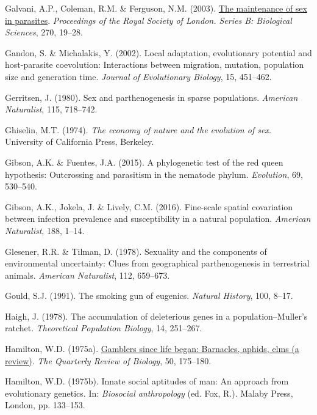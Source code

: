 \documentclass[
  letterpaper,
]{book}
\newlength{\cslhangindent}
\newenvironment{CSLReferences}[2] %
 {\begin{list}{}{%
  \setlength{\itemindent}{0pt}
  \setlength{\leftmargin}{0pt}
  \setlength{\parsep}{0pt}
  \ifodd #1
   \setlength{\leftmargin}{\cslhangindent}
   \setlength{\itemindent}{-1\cslhangindent}
  \fi
  \setlength{\itemsep}{#2\baselineskip}}}
 {\end{list}}
\begin{document}
\begin{CSLReferences}{1}{0}
Galvani, A.P., Coleman, R.M. \& Ferguson, N.M. (2003).
\href{https://doi.org/10.1098/rspb.2002.2182}{The maintenance of sex in
parasites}. \emph{Proceedings of the Royal Society of London. Series B:
Biological Sciences}, 270, 19--28.

Gandon, S. \& Michalakis, Y. (2002). Local adaptation, evolutionary
potential and host-parasite coevolution: Interactions between migration,
mutation, population size and generation time. \emph{Journal of
Evolutionary Biology}, 15, 451--462.

Gerritsen, J. (1980). Sex and parthenogenesis in sparse populations.
\emph{American Naturalist}, 115, 718--742.

Ghiselin, M.T. (1974). \emph{The economy of nature and the evolution of
sex}. University of California Press, Berkeley.

Gibson, A.K. \& Fuentes, J.A. (2015). A phylogenetic test of the red
queen hypothesis: Outcrossing and parasitism in the nematode phylum.
\emph{Evolution}, 69, 530--540.

Gibson, A.K., Jokela, J. \& Lively, C.M. (2016). Fine-scale spatial
covariation between infection prevalence and susceptibility in a natural
population. \emph{American Naturalist}, 188, 1--14.

Glesener, R.R. \& Tilman, D. (1978). Sexuality and the components of
environmental uncertainty: Clues from geographical parthenogenesis in
terrestrial animals. \emph{American Naturalist}, 112, 659--673.

Gould, S.J. (1991). The smoking gun of eugenics. \emph{Natural History},
100, 8--17.

Haigh, J. (1978). The accumulation of deleterious genes in a
population--{Muller's} ratchet. \emph{Theoretical Population Biology},
14, 251--267.

Hamilton, W.D. (1975a). \href{https://doi.org/10.1086/408439}{Gamblers
since life began: Barnacles, aphids, elms (a review)}. \emph{The
Quarterly Review of Biology}, 50, 175--180.

Hamilton, W.D. (1975b). Innate social aptitudes of man: An approach from
evolutionary genetics. In: \emph{Biosocial anthropology} (ed. Fox, R.).
Malaby Press, London, pp. 133--153.


\end{CSLReferences}
\end{document}
